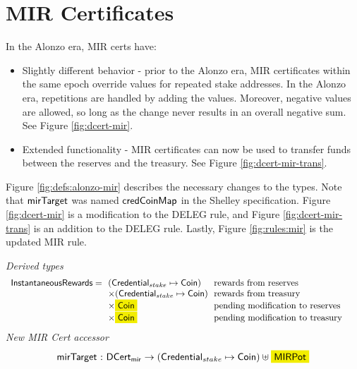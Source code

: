 \section{MIR Certificates}
\label{sec:mir}

\newcommand{\InstantaneousRewards}{\type{InstantaneousRewards}}
\newcommand{\MIRPot}{\type{MIRPot}}
\newcommand{\ReservesMIR}{\type{ReservesMIR}}
\newcommand{\TreasuryMIR}{\type{TreasuryMIR}}

In the Alonzo era, MIR certs have:

\begin{itemize}
  \item Slightly different behavior -
  prior to the Alonzo era, MIR certificates within the same epoch override
  values for repeated stake addresses.
  In the Alonzo era, repetitions are handled by adding the values.
  Moreover, negative values are allowed, so long as the change never results in
  an overall negative sum.
  See Figure \ref{fig:dcert-mir}.
  \item Extended functionality -
  MIR certificates can now be used to transfer funds between the reserves and the treasury.
  See Figure \ref{fig:dcert-mir-trans}.
\end{itemize}

Figure \ref{fig:defs:alonzo-mir} describes the necessary changes to the types.
Note that $\mathsf{mirTarget}$ was named $\mathsf{credCoinMap}$ in the Shelley specification.
Figure \ref{fig:dcert-mir} is a modification to the DELEG rule, and
Figure \ref{fig:dcert-mir-trans} is an addition to the DELEG rule.
Lastly, Figure \ref{fig:rules:mir} is the updated MIR rule.


\begin{figure*}[htb]
  \emph{Derived types}
  \begin{equation*}
    \begin{array}{r@{~~}l@{~~}l@{\qquad}l}
      \InstantaneousRewards =
      & (\StakeCredential \mapsto \Coin)
      & \text{rewards from reserves}
      \\
      & \times (\StakeCredential \mapsto \Coin)
      & \text{rewards from treasury}
      \\
      & \times \hldiff{\Coin}
      & \text{pending modification to reserves}
      \\
      & \times \hldiff{\Coin}
      & \text{pending modification to treasury}
    \end{array}
  \end{equation*}
  \emph{New MIR Cert accessor}
  \begin{equation*}
    \begin{array}{r@{~:~}lr}
      \fun{mirTarget}
      & \DCertMir \to (\StakeCredential \mapsto \Coin) \uniondistinct \hldiff{\MIRPot}
    \end{array}
  \end{equation*}
  \caption{Alonzo Types for MIR updates}
  \label{fig:defs:alonzo-mir}
\end{figure*}

